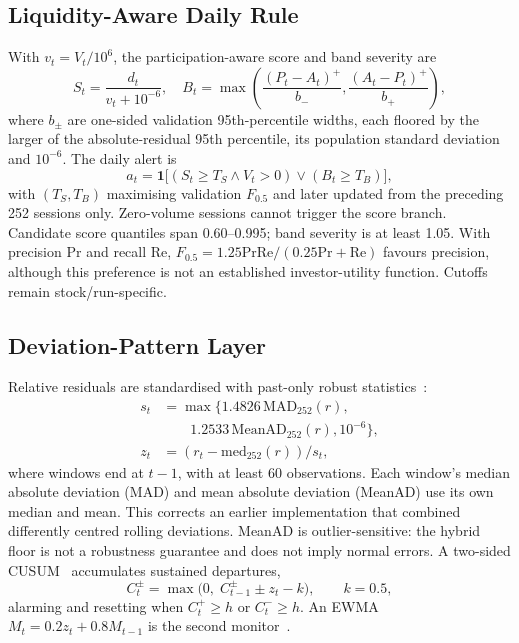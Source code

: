 \documentclass[conference]{IEEEtran}
\newcommand{\ind}{\mathbf{1}}
\begin{document}
\subsection{Liquidity-Aware Daily Rule}
With $v_t=V_t/10^6$, the participation-aware score and band severity are
\begin{equation}
S_t=\frac{d_t}{v_t+10^{-6}},\quad B_t=\max\!\left(\frac{(P_t-A_t)^+}{b_-},\frac{(A_t-P_t)^+}{b_+}\right)\!,
\end{equation}
where $b_\pm$ are one-sided validation 95th-percentile widths, each floored by the larger of the absolute-residual 95th percentile, its population standard deviation and $10^{-6}$. The daily alert is
\begin{equation}
a_t=\ind\big[(S_t\ge T_S\wedge V_t>0)\vee(B_t\ge T_B)\big],
\end{equation}
with $(T_S,T_B)$ maximising validation $F_{0.5}$ and later updated from the preceding 252 sessions only. Zero-volume sessions cannot trigger the score branch.
Candidate score quantiles span 0.60--0.995; band severity is at least 1.05. With precision $\mathrm{Pr}$ and recall $\mathrm{Re}$, $F_{0.5}=1.25\mathrm{Pr}\mathrm{Re}/(0.25\mathrm{Pr}+\mathrm{Re})$ favours precision, although this preference is not an established investor-utility function. Cutoffs remain stock/run-specific.

\subsection{Deviation-Pattern Layer}
Relative residuals are standardised with past-only robust statistics~\cite{rousseeuw1993}:
\begin{equation}
\begin{aligned}
s_t&=\max\{1.4826\,\mathrm{MAD}_{252}(r),\\
&\qquad1.2533\,\mathrm{MeanAD}_{252}(r),10^{-6}\},\\
z_t&=(r_t-\mathrm{med}_{252}(r))/s_t,
\end{aligned}
\end{equation}
where windows end at $t-1$, with at least 60 observations. Each window's median absolute deviation (MAD) and mean absolute deviation (MeanAD) use its own median and mean. This corrects an earlier implementation that combined differently centred rolling deviations. MeanAD is outlier-sensitive: the hybrid floor is not a robustness guarantee and does not imply normal errors. A two-sided CUSUM~\cite{page1954} accumulates sustained departures,
\begin{equation}
C_t^{\pm}=\max\big(0,\;C_{t-1}^{\pm}\pm z_t-k\big),\qquad k=0.5,
\end{equation}
alarming and resetting when $C_t^+\ge h$ or $C_t^-\ge h$. An EWMA $M_t=0.2z_t+0.8M_{t-1}$ is the second monitor~\cite{roberts1959}.
\end{document}
